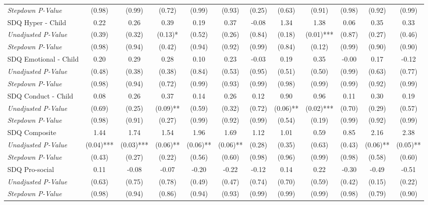 \begin{tabular}{l c c c c c c c c c c c}
\quad \textit{Stepdown P-Value} & (0.98) & (0.99) & (0.72) & (0.99) & (0.93) & (0.25) & (0.63) & (0.91) & (0.98) & (0.92) & (0.99) \\
SDQ Hyper - Child & 0.22 & 0.26 & 0.39 & 0.19 & 0.37 & -0.08 & 1.34 & 1.38 & 0.06 & 0.35 & 0.33 \\
\quad \textit{Unadjusted P-Value} & (0.39) & (0.32) & (0.13)* & (0.52) & (0.26) & (0.84) & (0.18) & (0.01)*** & (0.87) & (0.27) & (0.46) \\
\quad \textit{Stepdown P-Value} & (0.98) & (0.94) & (0.42) & (0.94) & (0.92) & (0.99) & (0.84) & (0.12) & (0.99) & (0.90) & (0.90) \\
SDQ Emotional - Child & 0.20 & 0.29 & 0.28 & 0.10 & 0.23 & -0.03 & 0.19 & 0.35 & -0.00 & 0.17 & -0.12 \\
\quad \textit{Unadjusted P-Value} & (0.48) & (0.38) & (0.38) & (0.84) & (0.53) & (0.95) & (0.51) & (0.50) & (0.99) & (0.63) & (0.77) \\
\quad \textit{Stepdown P-Value} & (0.98) & (0.94) & (0.72) & (0.99) & (0.93) & (0.99) & (0.98) & (0.99) & (0.99) & (0.92) & (0.99) \\
SDQ Conduct - Child & 0.08 & 0.26 & 0.37 & 0.14 & 0.26 & 0.12 & 0.90 & 0.96 & 0.11 & 0.30 & 0.19 \\
\quad \textit{Unadjusted P-Value} & (0.69) & (0.25) & (0.09)** & (0.59) & (0.32) & (0.72) & (0.06)** & (0.02)*** & (0.70) & (0.29) & (0.57) \\
\quad \textit{Stepdown P-Value} & (0.98) & (0.91) & (0.27) & (0.99) & (0.92) & (0.99) & (0.54) & (0.19) & (0.99) & (0.92) & (0.99) \\
SDQ Composite & 1.44 & 1.74 & 1.54 & 1.96 & 1.69 & 1.12 & 1.01 & 0.59 & 0.85 & 2.16 & 2.38 \\
\quad \textit{Unadjusted P-Value} & (0.04)*** & (0.03)*** & (0.06)** & (0.06)** & (0.06)** & (0.28) & (0.35) & (0.63) & (0.43) & (0.06)** & (0.05)** \\
\quad \textit{Stepdown P-Value} & (0.43) & (0.27) & (0.22) & (0.56) & (0.60) & (0.98) & (0.96) & (0.99) & (0.98) & (0.58) & (0.60) \\
SDQ Pro-social & 0.11 & -0.08 & -0.07 & -0.20 & -0.22 & -0.12 & 0.14 & 0.22 & -0.30 & -0.49 & -0.51 \\
\quad \textit{Unadjusted P-Value} & (0.63) & (0.75) & (0.78) & (0.49) & (0.47) & (0.74) & (0.70) & (0.59) & (0.42) & (0.15) & (0.22) \\
\quad \textit{Stepdown P-Value} & (0.98) & (0.94) & (0.86) & (0.94) & (0.93) & (0.99) & (0.99) & (0.99) & (0.98) & (0.79) & (0.90) \\

\end{tabular}
